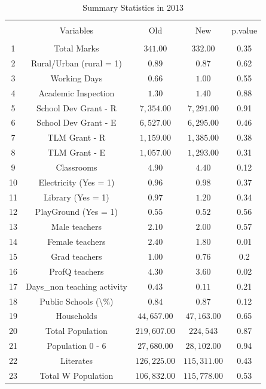 \documentclass[12pt, a4paper]{article}
\begin{document}
\begin{table}[!htbp] \centering 
  \caption{Summary Statistics in 2013} 
  \label{} 
\begin{tabular}{@{\extracolsep{5pt}} ccccc} 
\\[-1.8ex]\hline 
\hline \\[-1.8ex] 
 & Variables & Old & New & p.value \\ 
\hline \\[-1.8ex] 
1 & Total Marks & $341.00$ & $332.00$ & 0.35 \\ 
2 & Rural/Urban (rural = 1) & $0.89$ & $0.87$ & 0.62 \\ 
3 & Working Days & $0.66$ & $1.00$ & 0.55 \\ 
4 & Academic Inspection & $1.30$ & $1.40$ & 0.88 \\ 
5 & School Dev Grant - R & $7,354.00$ & $7,291.00$ & 0.91 \\ 
6 & School Dev Grant - E & $6,527.00$ & $6,295.00$ & 0.46 \\ 
7 & TLM Grant - R & $1,159.00$ & $1,385.00$ & 0.38 \\ 
8 & TLM Grant - E & $1,057.00$ & $1,293.00$ & 0.31 \\ 
9 & Classrooms & $4.90$ & $4.40$ & 0.12 \\ 
10 & Electricity (Yes = 1) & $0.96$ & $0.98$ & 0.37 \\ 
11 & Library  (Yes = 1) & $0.97$ & $1.20$ & 0.34 \\ 
12 & PlayGround  (Yes = 1) & $0.55$ & $0.52$ & 0.56 \\ 
13 & Male teachers & $2.10$ & $2.00$ & 0.57 \\ 
14 & Female teachers & $2.40$ & $1.80$ & 0.01 \\ 
15 & Grad teachers & $1.00$ & $0.76$ & 0.2 \\ 
16 & ProfQ teachers & $4.30$ & $3.60$ & 0.02 \\ 
17 & Days\_non teaching activity & $0.43$ & $0.11$ & 0.21 \\ 
18 & Public Schools (\textbackslash \%) & $0.84$ & $0.87$ & 0.12 \\ 
19 & Households & $44,657.00$ & $47,163.00$ & 0.65 \\ 
20 & Total Population & $219,607.00$ & $224,543$ & 0.87 \\ 
21 & Population 0 - 6 & $27,680.00$ & $28,102.00$ & 0.94 \\ 
22 & Literates & $126,225.00$ & $115,311.00$ & 0.43 \\ 
23 & Total W Population & $106,832.00$ & $115,778.00$ & 0.53 \\ 

\end{tabular}
\end{table}
\end{document}

